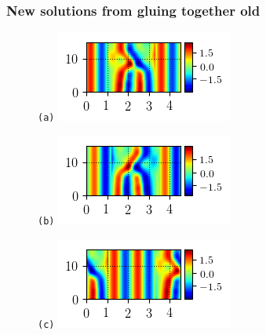 \documentclass[mathserif, handout]{beamer}
\begin{document}
\begin{frame}
\frametitle{New solutions from gluing together old}
\begin{figure}
\begin{minipage}[height=.20\textheight]{.5\textwidth}
\centering \small{\texttt{(a)}}
\includegraphics[width=.7\textwidth,height=.15\textheight]{MNG_ppo_subdomain2}
\end{minipage}
\begin{minipage}[height=.20\textheight]{.5\textwidth}
\centering \small{\texttt{(b)}}
\includegraphics[width=.7\textwidth,height=.15\textheight]{MNG_ppo_subdomain1}
\end{minipage}
\begin{minipage}[height=.20\textheight]{.5\textwidth}
\centering \small{\texttt{(c)}}
\includegraphics[width=.7\textwidth,height=.15\textheight]{MNG_ppo_subdomain0}
\end{minipage}
\end{figure}
\end{frame}
\end{document}
